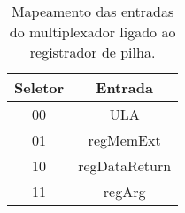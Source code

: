 \begin{table}[]
\centering
\begin{tabular}{|c|c|}
\hline
\textbf{Seletor} & \textbf{Entrada}       \\ \hline
00      & ULA           \\ \hline
01      & regMemExt     \\ \hline
10      & regDataReturn \\ \hline
11      & regArg        \\ \hline
\end{tabular}
\caption{Mapeamento das entradas do multiplexador ligado ao registrador de pilha.}
\label{table_muxPilha}
\end{table}